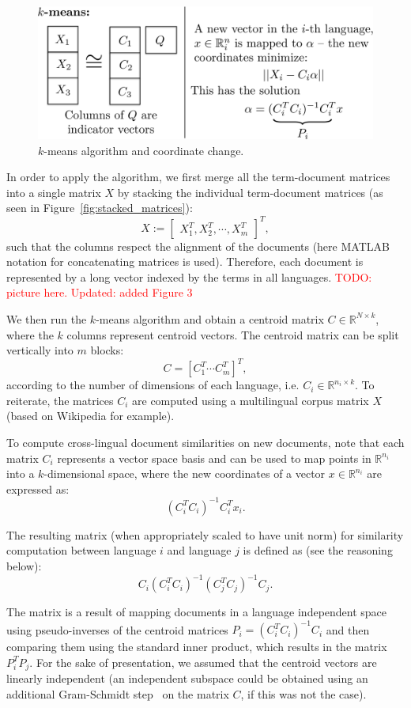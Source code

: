 \documentclass[twoside,11pt]{article}
\newcommand{\todo}[1]{\textcolor{red}{TODO: #1}}
\newcommand{\RR}{\mathbb{R}}
\begin{document}
\begin{figure}[tbp]
\centering
\includegraphics[width=\textwidth]{kmeans.pdf}
\caption{\label{fig:kmeans} $k$-means algorithm and coordinate change.}
\end{figure}

 In order to apply the algorithm, we first merge all the term-document matrices into a single matrix $X$ by stacking the individual term-document matrices (as seen in Figure~\ref{fig:stacked_matrices}):
$$X := \begin{bmatrix}X_1^T ,X_2^T, \cdots, X_m^T \end{bmatrix}^T,$$
such that the columns respect the alignment of the documents (here MATLAB notation for concatenating matrices is used). Therefore, each document  is represented by a long vector indexed by the terms in all languages. \todo{picture here. Updated: added Figure 3}

We then run the $k$-means algorithm \cite{kmeans} and obtain a centroid matrix $C \in \RR^{N \times k}$, where the $k$ columns represent centroid vectors. The centroid matrix can be split vertically into $m$ blocks: $$C = [C_1^T \cdots C_m^T]^T,$$ according to the number of dimensions of each language, i.e. $C_i \in \RR^{n_i \times k}$.
%
To reiterate, the matrices $C_i$ are computed using a multilingual corpus matrix $X$ (based on Wikipedia for example).

To compute  cross-lingual document similarities on new documents, note that each matrix $C_i$ represents a vector space basis and can be used to map points in $\RR^{n_i}$ into a $k$-dimensional space, where the new coordinates of a vector $x \in \RR^{n_i}$ are expressed as: $$(C_i^T C_i)^{-1} C_i^T x_i.$$

The resulting matrix (when appropriately scaled to have unit norm) for similarity computation between language $i$ and language $j$ is defined as (see the reasoning below):
$$C_i(C_i^T C_i)^{-1} (C_j^T C_j)^{-1} C_j.$$

The matrix is a result of mapping documents in a language independent space using pseudo-inverses of the centroid matrices $P_i = (C_i^T C_i)^{-1} C_i$ and then comparing them using the standard inner product, which results in the matrix $P_i^T P_j$. For the sake of presentation, we assumed that the centroid vectors are linearly independent (an independent subspace could be obtained using an additional Gram-Schmidt step~\cite{golub} on the matrix $C$, if this was not the case).
\end{document}
